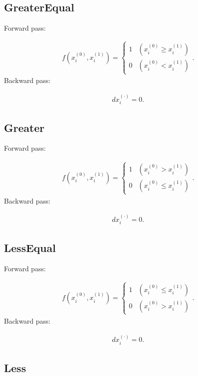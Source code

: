 \documentclass{article}
\begin{document}
\subsection{GreaterEqual}

Forward pass:

\begin{eqnarray}
  f(x^{(0)}_i,x^{(1)}_i) = \begin{cases}
    1  & (x^{(0)}_i \geq x^{(1)}_i) \\
    0 & (x^{(0)}_i < x^{(1)}_i)
  \end{cases}.
\end{eqnarray}
%
Backward pass:

\begin{eqnarray}
  dx^{(\cdot)}_i = 0.
\end{eqnarray}
\subsection{Greater}

Forward pass:

\begin{eqnarray}
  f(x^{(0)}_i,x^{(1)}_i) = \begin{cases}
    1  & (x^{(0)}_i > x^{(1)}_i) \\
    0 & (x^{(0)}_i \leq x^{(1)}_i)
  \end{cases}.
\end{eqnarray}
%
Backward pass:

\begin{eqnarray}
  dx^{(\cdot)}_i = 0.
\end{eqnarray}

\subsection{LessEqual}

Forward pass:

\begin{eqnarray}
  f(x^{(0)}_i,x^{(1)}_i) = \begin{cases}
    1  & (x^{(0)}_i \leq x^{(1)}_i) \\
    0 & (x^{(0)}_i > x^{(1)}_i)
  \end{cases}.
\end{eqnarray}
%
Backward pass:

\begin{eqnarray}
  dx^{(\cdot)}_i = 0.
\end{eqnarray}

\subsection{Less}
\end{document}

